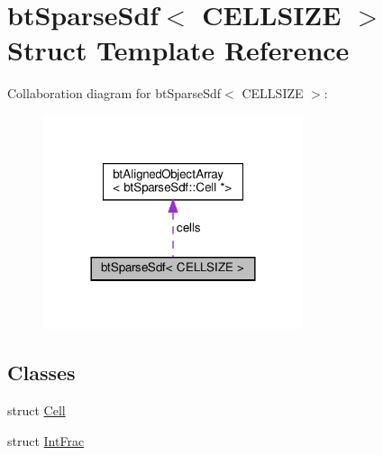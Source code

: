 \hypertarget{structbtSparseSdf}{}\section{bt\+Sparse\+Sdf$<$ C\+E\+L\+L\+S\+I\+ZE $>$ Struct Template Reference}
\label{structbtSparseSdf}


Collaboration diagram for bt\+Sparse\+Sdf$<$ C\+E\+L\+L\+S\+I\+ZE $>$\+:
\nopagebreak
\begin{figure}[H]
\begin{center}
\leavevmode
\includegraphics[width=216pt]{structbtSparseSdf__coll__graph}
\end{center}
\end{figure}
\subsection*{Classes}
\begin{DoxyCompactItemize}
\item 
struct \hyperlink{structbtSparseSdf_1_1Cell}{Cell}
\item 
struct \hyperlink{structbtSparseSdf_1_1IntFrac}{Int\+Frac}
\end{DoxyCompactItemize}
